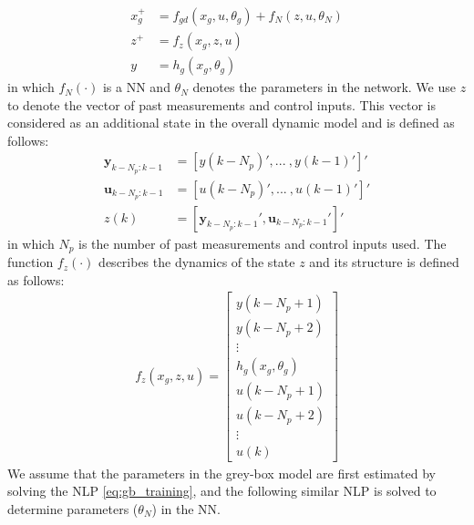 \documentclass[10pt]{article}
\begin{document}
\begin{align*}
  x_g^+ &= f_{gd}(x_g, u, \theta_g) + f_N(z, u, \theta_N) \\
  z^+ &= f_z(x_g, z, u) \\
  y &= h_g(x_g, \theta_g)
\end{align*}
in which $f_N(\cdot)$ is a NN and $\theta_N$ denotes the parameters in the network. We use $z$ to denote the vector of past measurements and control inputs. This vector is considered as an additional state in the overall dynamic model and is defined as follows:
\begin{align} \label{eq:pastyu}
  \mathbf{y}_{k-N_p:k-1} &= [y(k-N_p)', ... \ , y(k-1)']' \nonumber \\
  \mathbf{u}_{k-N_p:k-1} &= [u(k-N_p)', ... \ , u(k-1)']' \nonumber \\
  z(k) &= [\mathbf{y}_{k-N_p:k-1}', \mathbf{u}_{k-N_p:k-1}']'
\end{align}
in which $N_p$ is the number of past measurements and control inputs used. The function $f_z(\cdot)$ describes the dynamics of the state $z$ and its structure is defined as follows: 
\begin{align*}
  f_z(x_g, z, u) = \begin{bmatrix}
    y(k-N_p+1) \\
    y(k-N_p+2) \\
    \vdots \\
    h_g(x_g, \theta_g) \\
    u(k-N_p+1) \\ 
    u(k-N_p+2) \\
    \vdots \\
    u(k)
  \end{bmatrix}
\end{align*}
We assume that the parameters in the grey-box model are first estimated by solving the NLP \eqref{eq:gb_training}, and the following similar NLP is solved to determine parameters ($\theta_N$) in the NN.
\end{document}
